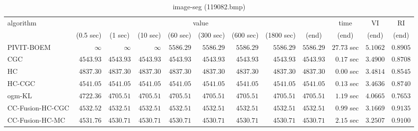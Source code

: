 \begin{table}[H]
\scriptsize
\centering
\caption{image-seg (119082.bmp)}
\label{tab:anytimetable-image-seg-119082.bmp}
\begin{tabular}{lrrrrrrrrrrr}
\toprule
           algorithm &                                   \multicolumn{8}{c}{value} & \multicolumn{1}{c}{time}    & \multicolumn{1}{c}{VI}  & \multicolumn{1}{c}{RI} \\  
\cmidrule(lr){2-9}\cmidrule(lr){10-10} \cmidrule(lr){11-11} \cmidrule(lr){12-12}   
                     & \multicolumn{1}{c}{(0.5 sec)} & \multicolumn{1}{c}{(1 sec)} & \multicolumn{1}{c}{(10 sec)} & \multicolumn{1}{c}{(60 sec)} & \multicolumn{1}{c}{(300 sec)} & \multicolumn{1}{c}{(600 sec)} & \multicolumn{1}{c}{(1800 sec)} & \multicolumn{1}{c}{(end)} & \multicolumn{1}{c}{(end)}    & \multicolumn{1}{c}{(end)}   & \multicolumn{1}{c}{(end)}  \\ \midrule 
          PIVIT-BOEM & $\infty$ & $\infty$ & $\infty$ & $      5586.29$ & $      5586.29$ & $      5586.29$ & $      5586.29$ & $      5586.29$ & $        27.73$ sec    & $       5.1062$  & $       0.8905$ \\ 
                 CGC & $      4543.93$ & $      4543.93$ & $      4543.93$ & $      4543.93$ & $      4543.93$ & $      4543.93$ & $      4543.93$ & $      4543.93$ & $         0.17$ sec    & $       3.4900$  & $       0.8708$ \\ 
                  HC & $      4837.30$ & $      4837.30$ & $      4837.30$ & $      4837.30$ & $      4837.30$ & $      4837.30$ & $      4837.30$ & $      4837.30$ & $         0.00$ sec    & $       3.4814$  & $       0.8545$ \\ 
              HC-CGC & $      4541.05$ & $      4541.05$ & $      4541.05$ & $      4541.05$ & $      4541.05$ & $      4541.05$ & $      4541.05$ & $      4541.05$ & $         0.13$ sec    & $       3.4636$  & $       0.8740$ \\ 
              ogm-KL & $      4722.36$ & $      4705.51$ & $      4705.51$ & $      4705.51$ & $      4705.51$ & $      4705.51$ & $      4705.51$ & $      4705.51$ & $         1.19$ sec    & $       4.0665$  & $       0.7653$ \\ 
    CC-Fusion-HC-CGC & $      4532.52$ & $      4532.51$ & $      4532.51$ & $      4532.51$ & $      4532.51$ & $      4532.51$ & $      4532.51$ & $      4532.51$ & $         0.99$ sec    & $       3.1669$  & $       0.9135$ \\ 
     CC-Fusion-HC-MC & $      4531.76$ & $      4530.71$ & $      4530.71$ & $      4530.71$ & $      4530.71$ & $      4530.71$ & $      4530.71$ & $      4530.71$ & $         2.15$ sec    & $       3.2507$  & $       0.9100$ \\ 

\end{tabular}
\end{table}
